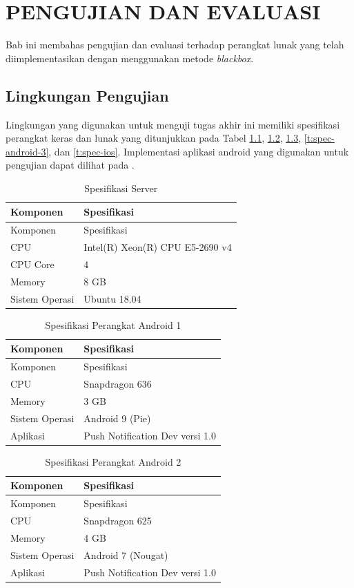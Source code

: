 \chapter{PENGUJIAN DAN EVALUASI}
\par Bab ini membahas pengujian dan evaluasi terhadap perangkat lunak yang telah diimplementasikan dengan menggunakan metode \textit{blackbox}.

\section{Lingkungan Pengujian}
\par Lingkungan yang digunakan untuk menguji tugas akhir ini memiliki spesifikasi perangkat keras dan lunak yang ditunjukkan pada Tabel \ref{t:spec-server}, \ref{t:spec-android}, \ref{t:spec-android-2}, \ref{t:spec-android-3}, dan \ref{t:spec-ios}. Implementasi aplikasi android yang digunakan untuk pengujian dapat dilihat pada .
\begin{longtable}{|p{3cm}|p{6cm}|}
	\caption{Spesifikasi Server} \label{t:spec-server} \\ \hline
    \rowcolor{lightgray} Komponen & Spesifikasi \\ \hline
    \endfirsthead
    \hline
    \rowcolor{lightgray} Komponen & Spesifikasi \\ \hline
    \endhead
    CPU & Intel(R) Xeon(R) CPU E5-2690 v4 \\ \hline
    CPU Core & 4 \\ \hline
    Memory & 8 GB \\ \hline
    Sistem Operasi & Ubuntu 18.04 \\ \hline
\end{longtable}
\begin{longtable}{|p{3cm}|p{6cm}|}
	\caption{Spesifikasi Perangkat Android 1} \label{t:spec-android} \\ \hline
	\rowcolor{lightgray} Komponen & Spesifikasi \\ \hline
	\endfirsthead
	\hline
	\rowcolor{lightgray} Komponen & Spesifikasi \\ \hline
	\endhead
    CPU & Snapdragon 636 \\ \hline
    Memory & 3 GB \\ \hline
    Sistem Operasi & Android 9 (Pie) \\ \hline
    Aplikasi & Push Notification Dev versi 1.0 \\ \hline
\end{longtable}
\begin{longtable}{|p{3cm}|p{6cm}|}
	\caption{Spesifikasi Perangkat Android 2} \label{t:spec-android-2} \\ \hline
	\rowcolor{lightgray} Komponen & Spesifikasi \\ \hline
	\endfirsthead
	\hline
	\rowcolor{lightgray} Komponen & Spesifikasi \\ \hline
	\endhead
	CPU & Snapdragon 625 \\ \hline
	Memory & 4 GB \\ \hline
	Sistem Operasi & Android 7 (Nougat) \\ \hline
	Aplikasi & Push Notification Dev versi 1.0 \\ \hline
\end{longtable}
